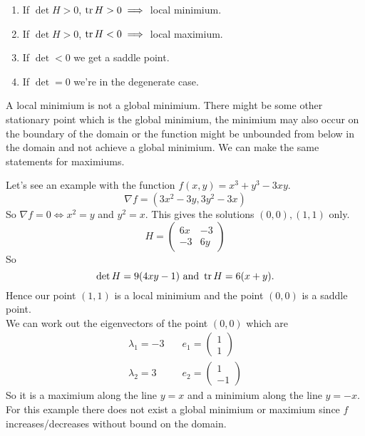 \documentclass{article}
\begin{document}
  \begin{enumerate}
	  \item If $ \det H>0 $, $ \tr H>0 \implies $ local minimium.
	  \item If $ \det H>0 $, $ \tr H<0 \implies $ local maximium.
	  \item If $ \det < 0 $ we get a saddle point.
	  \item If $ \det = 0 $ we're in the degenerate case.
  \end{enumerate}
  \begin{remark}
    A local minimium is not a global minimium. There might be some other stationary point which is the global minimium, the minimium may also occur on the boundary of the domain or the function might be unbounded from below in the domain and not achieve a global minimium. We can make the same statements for maximiums.
\end{remark}
Let's see an example with the function $ f(x,y)=x^3+y^3-3xy $.
\[
  \nabla f=(3x^2-3y,3y^2-3x)
\]
So $ \nabla f = 0\iff x^2=y $ and $ y^2=x $. This gives the solutions $ (0,0),(1,1) $ only.
\[
	H= 
  \begin{pmatrix}
	  6x & -3 \\
	  -3 & 6y
  \end{pmatrix}
\]
So
\[
	\det H = 9(4xy-1) \text{ and } \tr H = 6(x+y).
\]
Hence our point $ (1,1) $ is a local minimium and the point $ (0,0) $ is a saddle point.\\
We can work out the eigenvectors of the point $ (0,0) $ which are
\begin{align*}
	\lambda_1=-3 &\quad e_1=\begin{pmatrix}
	  1 \\
	  1
	\end{pmatrix}\\
		\lambda_2=3 &\quad e_2=\begin{pmatrix}
		  1 \\
		  -1
		\end{pmatrix}
\end{align*}
So it is a maximium along the line $ y=x $ and a minimium along the line $ y=-x $.\\
For this example there does not exist a global minimium or maximium since $ f $ increases/decreases without bound on the domain.
\end{document}
